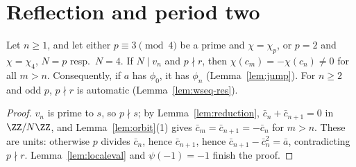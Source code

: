 \section{Reflection and period two}

\begin{lemma}[Reflection]
  \label{lem:reflection}
  \leanok
  Let $n \ge 1$, and let either $p \equiv 3 \pmod 4$ be a prime and $\chi = \chi_p$, or $p = 2$
  and $\chi = \chi_4$, $N = p$ resp.\ $N = 4$. If $N \mid v_n$ and $p \nmid r$, then
  $\chi(c_m) = -\chi(c_n) \ne 0$ for all $m > n$. Consequently, if $a$ has $\phi_0$, it has
  $\phi_n$ (Lemma~\ref{lem:jump}). For $n \ge 2$ and odd $p$, $p \nmid r$ is automatic
  (Lemma~\ref{lem:wseq-res}).
\end{lemma}
\begin{proof}
  \leanok
  $v_n$ is prime to $s$, so $p \nmid s$; by Lemma~\ref{lem:reduction},
  $\bar c_n + \bar c_{n+1} = 0$ in $\ZZ/N\ZZ$, and Lemma~\ref{lem:orbit}(1) gives
  $\bar c_m = \bar c_{n+1} = -\bar c_n$ for $m > n$. These are units: otherwise $p$ divides
  $\bar c_n$, hence $\bar c_{n+1}$, hence $\bar c_{n+1} - \bar c_n^2 = \bar a$, contradicting
  $p \nmid r$. Lemma~\ref{lem:localeval} and $\psi(-1) = -1$ finish the proof.
\end{proof}

